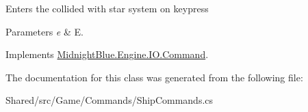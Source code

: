Enters the collided with star system on keypress 


\begin{DoxyParams}{Parameters}
{\em e} & E.\\
\hline
\end{DoxyParams}


Implements \hyperlink{class_midnight_blue_1_1_engine_1_1_i_o_1_1_command_ae641d2c1a9db17f03ee6b7854b00a9d2}{Midnight\+Blue.\+Engine.\+I\+O.\+Command}.



The documentation for this class was generated from the following file\+:\begin{DoxyCompactItemize}
\item 
Shared/src/\+Game/\+Commands/Ship\+Commands.\+cs\end{DoxyCompactItemize}
